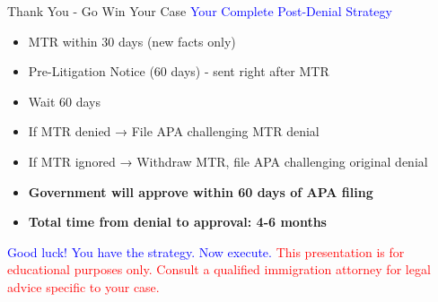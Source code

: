 \documentclass[11pt]{beamer}
\begin{document}
	\begin{frame}{Thank You - Go Win Your Case}
		\centering
		\vspace{1cm}
		\textcolor{blue}{\Large Your Complete Post-Denial Strategy}
		\vspace{0.5cm}
		\begin{itemize}
			\item MTR within 30 days (new facts only)
			\item Pre-Litigation Notice (60 days) - sent right after MTR
			\item Wait 60 days
			\item If MTR denied → File APA challenging MTR denial
			\item If MTR ignored → Withdraw MTR, file APA challenging original denial
			\item \textbf{Government will approve within 60 days of APA filing}
			\item \textbf{Total time from denial to approval: 4-6 months}
		\end{itemize}
		\vspace{0.5cm}
		\textcolor{blue}{\Large Good luck! You have the strategy. Now execute.}
		\vspace{0.5cm}
		\textcolor{red}{This presentation is for educational purposes only. Consult a qualified immigration attorney for legal advice specific to your case.}
	\end{frame}
	
\end{document}
